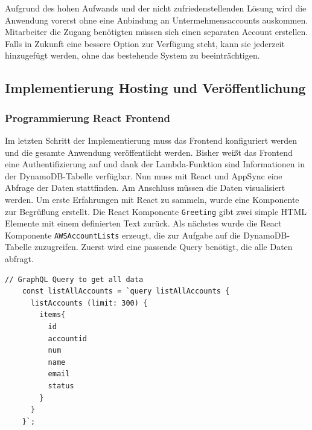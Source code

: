 Aufgrund des hohen Aufwands und der nicht zufriedenstellenden Lösung wird die Anwendung vorerst ohne eine Anbindung an Untermehmensaccounts auskommen.
Mitarbeiter die Zugang benötigten müssen sich einen separaten Account erstellen.
Falls in Zukunft eine bessere Option zur Verfügung steht, kann sie jederzeit hinzugefügt werden, ohne das bestehende System zu beeinträchtigen.


\subsection{Implementierung Hosting und Veröffentlichung}

\subsubsection{Programmierung React Frontend}
Im letzten Schritt der Implementierung muss das Frontend konfiguriert werden und die gesamte Anwendung veröffentlicht werden.
Bisher weißt das Frontend eine Authentifizierung auf und dank der Lambda-Funktion sind Informationen in der DynamoDB-Tabelle verfügbar.
Nun muss mit React und AppSync eine Abfrage der Daten stattfinden.
Am Anschluss müssen die Daten visualisiert werden.
Um erste Erfahrungen mit React zu sammeln, wurde eine Komponente zur Begrüßung erstellt.
Die React Komponente \verb+Greeting+ gibt zwei simple HTML Elemente mit einem definierten Text zurück.
Als nächstes wurde die React Komponente \verb+AWSAccountLists+ erzeugt, die zur Aufgabe auf die DynamoDB-Tabelle zuzugreifen.
Zuerst wird eine passende Query benötigt, die alle Daten abfragt.
\begin{lstlisting}[basicstyle=\ttfamily\small, breaklines=true , frame = single, backgroundcolor=\color{lavender} ]
    // GraphQL Query to get all data
    const listAllAccounts = `query listAllAccounts {
      listAccounts (limit: 300) {
        items{
          id
          accountid
          num
          name
          email
          status
        }
      }
    }`;
    \end{lstlisting}



